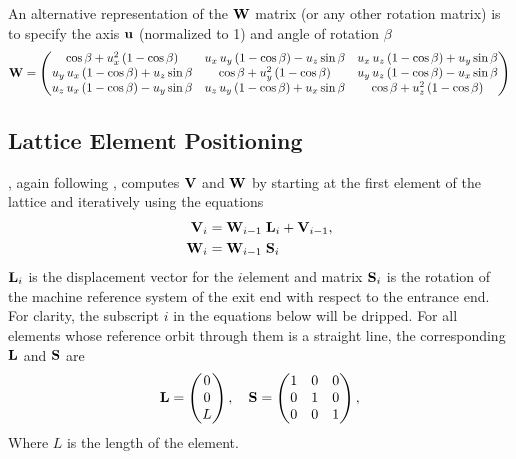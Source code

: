 An alternative representation of the ${\bf W}$ matrix (or any other rotation matrix) is to specify the
axis ${\bf u}$ (normalized to 1) and angle of rotation $\beta$
\begin{equation}
  {\bf W} = \begin{pmatrix}
    \cos \beta + u_x^2 \left(1 - \cos \beta \right) & 
    u_x \, u_y \left(1 - \cos \beta \right) - u_z \sin \beta & 
    u_x \, u_z \left(1 - \cos \beta \right) + u_y \sin \beta \\ 
    u_y \, u_x \left(1 - \cos \beta \right) + u_z \sin \beta & 
    \cos \beta + u_y^2\left(1 - \cos \beta \right) & 
    u_y \, u_z \left(1 - \cos \beta \right) - u_x \sin \beta \\ 
    u_z \, u_x \left(1 - \cos \beta \right) - u_y \sin \beta & 
    u_z \, u_y \left(1 - \cos \beta \right) + u_x \sin \beta & 
    \cos \beta + u_z^2\left(1 - \cos \beta \right)
  \end{pmatrix}
  \label{wctux2}
\end{equation}

\subsection{Lattice Element Positioning}
\label{s:ele.pos}

\accellat, again following \mad, computes ${\bf V}$ and ${\bf W}$ by starting at the first element of the
lattice and iteratively using the equations
\begin{align}
  {\bf V}_i &= {\bf W}_{i-1} \; {\bf L}_i + {\bf V}_{i-1}, 
    \label{vwlv} \\
  {\bf W}_i &= {\bf W}_{i-1} \; {\bf S}_i
    \label{wws}
\end{align}
${\bf L}_i$ is the displacement vector for the $i$\Th element and matrix ${\bf S}_i$ is the rotation of
the machine reference system of the exit end with respect to the entrance end. For clarity, the
subscript $i$ in the equations below will be dripped. For all elements whose reference orbit through
them is a straight line, the corresponding ${\bf L}$ and ${\bf S}$ are
\begin{equation}
  {\bf L} = 
  \begin{pmatrix}
      0 \\ 0 \\ L
  \end{pmatrix},
  \quad
  {\bf S} = 
  \begin{pmatrix}
      1 & 0 & 0 \\ 
      0 & 1 & 0 \\
      0 & 0 & 1
  \end{pmatrix},
  \label{l00l}
\end{equation}
Where $L$ is the length of the element. 

